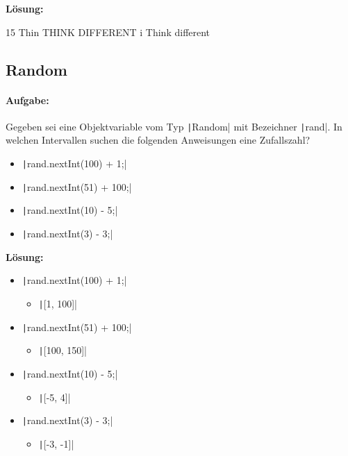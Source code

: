 \documentclass[a4paper,10pt, dvipsnames]{report}
\begin{document}
\textbf{Lösung:}

\begin{textcodebox}
15
Thin
THINK DIFFERENT
i
Think different
\end{textcodebox}

\subsection{Random}

\paragraph{Aufgabe:}
Gegeben sei eine Objektvariable vom Typ \texttt|Random| mit Bezeichner \texttt|rand|. In welchen Intervallen suchen die folgenden Anweisungen eine Zufallszahl?

\begin{itemize}
    \item \texttt|rand.nextInt(100) + 1;|
    \item \texttt|rand.nextInt(51) + 100;|
    \item \texttt|rand.nextInt(10) - 5;|
    \item \texttt|rand.nextInt(3) - 3;|
\end{itemize}

\textbf{Lösung:}

\begin{itemize}
    \item \texttt|rand.nextInt(100) + 1;|
    \begin{itemize}
        \item \texttt|[1, 100]|
    \end{itemize}
    \item \texttt|rand.nextInt(51) + 100;|
    \begin{itemize}
        \item \texttt|[100, 150]|
    \end{itemize}
    \item \texttt|rand.nextInt(10) - 5;|
    \begin{itemize}
        \item \texttt|[-5, 4]|
    \end{itemize}
    \item \texttt|rand.nextInt(3) - 3;|
    \begin{itemize}
        \item \texttt|[-3, -1]|
    \end{itemize}
\end{itemize}
\end{document}
